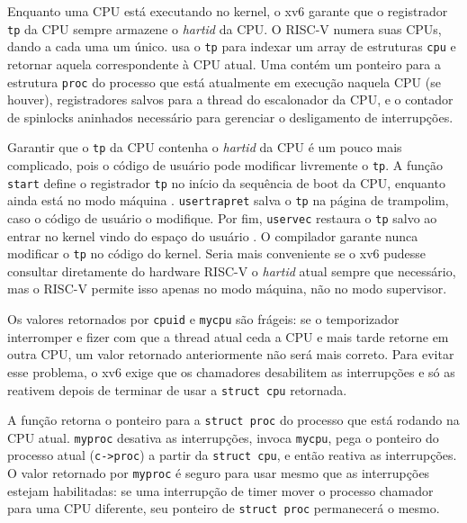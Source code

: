Enquanto uma CPU está executando no kernel, o xv6 garante que o registrador \lstinline{tp} da CPU sempre armazene o \textit{hartid} da CPU.
O RISC-V numera suas CPUs, dando a cada uma um  único.
usa o \lstinline{tp} para indexar um array de estruturas \lstinline{cpu} e retornar aquela correspondente à CPU atual.
Uma
contém um ponteiro para a estrutura \lstinline{proc} do processo que está atualmente em execução naquela CPU (se houver),
registradores salvos para a thread do escalonador da CPU,
e o contador de spinlocks aninhados necessário para gerenciar o desligamento de interrupções.

Garantir que o \lstinline{tp} da CPU contenha o \textit{hartid} da CPU é um pouco mais complicado, pois o código de usuário pode modificar livremente o \lstinline{tp}.
A função \lstinline{start} define o registrador \lstinline{tp} no início da sequência de boot da CPU, enquanto ainda está no modo máquina
.
\lstinline{usertrapret} salva o \lstinline{tp} na página de trampolim, caso o código de usuário o modifique.
Por fim, \lstinline{uservec} restaura o \lstinline{tp} salvo ao entrar no kernel vindo do espaço do usuário
.
O compilador garante nunca modificar o \lstinline{tp} no código do kernel.
Seria mais conveniente se o xv6 pudesse consultar diretamente do hardware RISC-V o \textit{hartid} atual sempre que necessário,
mas o RISC-V permite isso apenas no modo máquina, não no modo supervisor.

Os valores retornados por
\lstinline{cpuid}
e
\lstinline{mycpu}
são frágeis: se o temporizador interromper e fizer com que a thread atual ceda a CPU e mais tarde retorne em outra CPU,
um valor retornado anteriormente não será mais correto.
Para evitar esse problema, o xv6 exige que os chamadores desabilitem as interrupções e só as reativem depois de terminar de usar a
\lstinline{struct cpu} retornada.

A função
retorna o ponteiro para a
\lstinline{struct proc}
do processo que está rodando na CPU atual.
\lstinline{myproc}
desativa as interrupções, invoca
\lstinline{mycpu},
pega o ponteiro do processo atual
(\lstinline{c->proc})
a partir da
\lstinline{struct cpu},
e então reativa as interrupções.
O valor retornado por
\lstinline{myproc}
é seguro para usar mesmo que as interrupções estejam habilitadas:
se uma interrupção de timer mover o processo chamador para uma CPU diferente, seu ponteiro de
\lstinline{struct proc}
permanecerá o mesmo.

